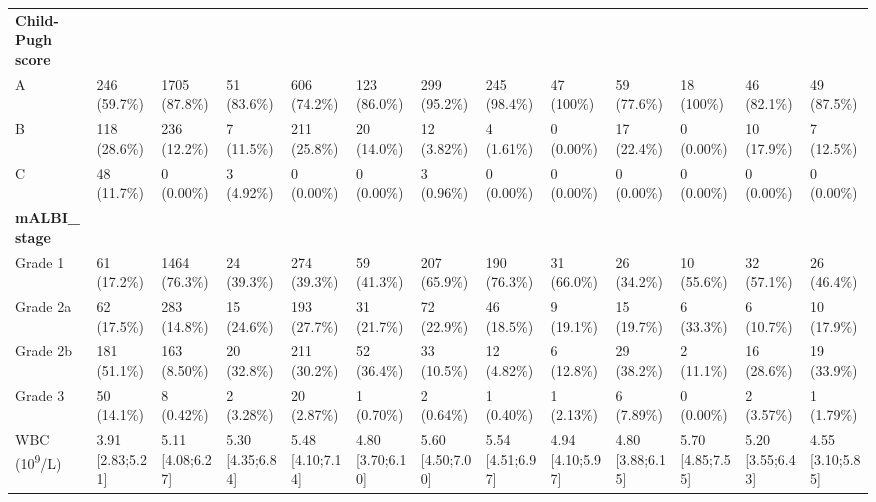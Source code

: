 \documentclass{article}
\begin{document}
\begin{landscape}
\begin{tiny}
\begin{tabularx}{\linewidth}{p{4.5cm}|X|X|X|X|X|X|X|X|X|X|X|X}
\textbf{Child-Pugh score}  &  &  &  &  &  &  &  &  &  &  &  &  \\
\rowcolor{gray!10}
    A &   246 (59.7\%)    &   1705 (87.8\%)   &    51 (83.6\%)    &   606 (74.2\%)    &   123 (86.0\%)    &   299 (95.2\%)    &   245 (98.4\%)    &    47 (100\%)     &    59 (77.6\%)    &    18 (100\%)     &    46 (82.1\%)    &    49 (87.5\%)    \\
\rowcolor{gray!10}
    B &   118 (28.6\%)    &   236 (12.2\%)    &    7 (11.5\%)     &   211 (25.8\%)    &    20 (14.0\%)    &    12 (3.82\%)    &    4 (1.61\%)     &    0 (0.00\%)     &    17 (22.4\%)    &    0 (0.00\%)     &    10 (17.9\%)    &    7 (12.5\%)     \\
\rowcolor{gray!10}
    C &    48 (11.7\%)    &    0 (0.00\%)     &    3 (4.92\%)     &    0 (0.00\%)     &    0 (0.00\%)     &    3 (0.96\%)     &    0 (0.00\%)     &    0 (0.00\%)     &    0 (0.00\%)     &    0 (0.00\%)     &    0 (0.00\%)     &    0 (0.00\%)     \\
\rowcolor{gray!30}
\textbf{mALBI\_stage }  &  &  &  &  &  &  &  &  &  &  &  &  \\
\rowcolor{gray!10}
    Grade 1 &    61 (17.2\%)    &   1464 (76.3\%)   &    24 (39.3\%)    &   274 (39.3\%)    &    59 (41.3\%)    &   207 (65.9\%)    &   190 (76.3\%)    &    31 (66.0\%)    &    26 (34.2\%)    &    10 (55.6\%)    &    32 (57.1\%)    &    26 (46.4\%)    \\
\rowcolor{gray!10}
    Grade 2a &    62 (17.5\%)    &   283 (14.8\%)    &    15 (24.6\%)    &   193 (27.7\%)    &    31 (21.7\%)    &    72 (22.9\%)    &    46 (18.5\%)    &    9 (19.1\%)     &    15 (19.7\%)    &    6 (33.3\%)     &    6 (10.7\%)     &    10 (17.9\%)    \\
\rowcolor{gray!10}
    Grade 2b &   181 (51.1\%)    &   163 (8.50\%)    &    20 (32.8\%)    &   211 (30.2\%)    &    52 (36.4\%)    &    33 (10.5\%)    &    12 (4.82\%)    &    6 (12.8\%)     &    29 (38.2\%)    &    2 (11.1\%)     &    16 (28.6\%)    &    19 (33.9\%)    \\
\rowcolor{gray!10}
    Grade 3 &    50 (14.1\%)    &    8 (0.42\%)     &    2 (3.28\%)     &    20 (2.87\%)    &    1 (0.70\%)     &    2 (0.64\%)     &    1 (0.40\%)     &    1 (2.13\%)     &    6 (7.89\%)     &    0 (0.00\%)     &    2 (3.57\%)     &    1 (1.79\%)     \\
\rowcolor{gray!10}
WBC (10\textsuperscript{9}/L) & 3.91 [2.83;5.21] & 5.11 [4.08;6.27] & 5.30 [4.35;6.84] & 5.48 [4.10;7.14] & 4.80 [3.70;6.10] & 5.60 [4.50;7.00] & 5.54 [4.51;6.97] & 4.94 [4.10;5.97] & 4.80 [3.88;6.15] & 5.70 [4.85;7.55] & 5.20 [3.55;6.43] & 4.55 [3.10;5.85] \\

\end{tabularx}
\end{tiny}
\end{landscape}
\end{document}
